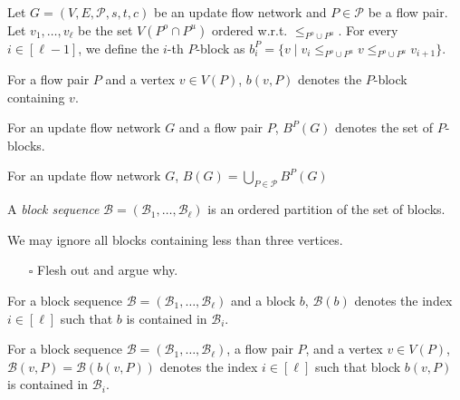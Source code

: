 \documentclass[fontsize=11pt,paper=a4]{book}
\begin{document}
\begin{defn}
Let \(G=(V,E,\mathcal{P},s,t,c)\) be an update flow network and \(P\in\mathcal{P}\) be a flow pair.
Let \(v_1,\dots,v_{\ell}\) be the set \(V(P^o\cap P^u)\) ordered w.r.t. \(\leq_{P^o\cup P^u}\).
For every \(i\in[\ell-1]\), we define the \(i\)-th \(P\)-block as \(b_i^P=\{v\mid v_i\leq_{P^o\cup P^u}v\leq_{P^o\cup P^u}v_{i+1}\}\).
\label{org6031c0c}
\end{defn}

\begin{notation}
For a flow pair \(P\) and a vertex \(v\in V(P)\), \(b(v,P)\) denotes the \(P\)-block containing \(v\).
\label{org0c45832}
\end{notation}

\begin{notation}
For an update flow network \(G\) and a flow pair \(P\), \(B^P(G)\) denotes the set of \(P\)-blocks.
\label{org881382e}
\end{notation}

\begin{notation}
For an update flow network \(G\), \(B(G)=\bigcup_{P\in\mathcal{P}}B^P(G)\)
\label{org096be0d}
\end{notation}

\begin{defn}
A \emph{block sequence} \(\mathcal{B}=(\mathscr{B}_1,\dots,\mathscr{B}_{\ell})\) is an ordered partition of the set of blocks.
\label{orgf276968}
\end{defn}

\begin{remark}
We may ignore all blocks containing less than three vertices.
\label{org52f5a03}
\end{remark}

\begin{itemize}
\item[{$\square$}] Flesh out and argue why.
\end{itemize}

\begin{notation}
For a block sequence \(\mathcal{B}=(\mathscr{B}_1,\dots,\mathscr{B}_{\ell})\) and a block \(b\), \(\mathcal{B}(b)\) denotes the index \(i\in[\ell]\) such that \(b\) is contained in \(\mathscr{B}_i\).
\label{orgdbe2a03}
\end{notation}

\begin{notation}
For a block sequence \(\mathcal{B}=(\mathscr{B}_1,\dots,\mathscr{B}_{\ell})\), a flow pair \(P\), and a vertex \(v\in V(P)\), \(\mathcal{B}(v,P)=\mathcal{B}(b(v,P))\) denotes the index \(i\in[\ell]\) such that block \(b(v,P)\) is contained in \(\mathscr{B}_i\).
\label{orgdc3d476}
\end{notation}
\end{document}
